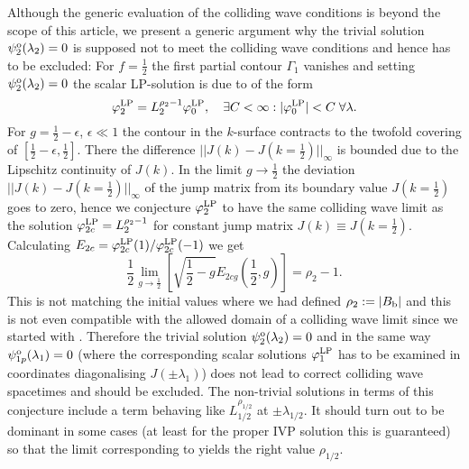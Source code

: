 \documentclass[12pt]{iopart}
\begin{document}
Although the generic evaluation of the colliding wave conditions is beyond the scope of this article, we present a generic argument why the trivial solution $\psi_2^{\rm o}(\lambda_2)=0$ is supposed not to meet the colliding wave conditions and hence has to be excluded:
 For $f=\frac12$ the first partial contour $\Gamma_1$ vanishes and setting $\psi_2^{\rm o}(\lambda_2)=0$ the scalar LP-solution is due to  of the form 
\begin{equation}
\varphi_2^{\rm LP}=L_2^{\rho_2-1}\varphi_0^{\rm LP}, \quad \exists C<\infty: |\varphi_0^{\rm LP}|<C \;\forall \lambda.
\end{equation}
For $g=\frac12-\epsilon$, $\epsilon\ll 1$ the contour in the $k$-surface contracts to the twofold covering of $[\frac12-\epsilon,\frac12]$. There the difference $||J(k)-J(k=\frac12)||_\infty$ is bounded due to the Lipschitz continuity of $J(k)$. In the limit $g\to \frac12$ the deviation $||J(k)-J(k=\frac12)||_\infty$ of the jump matrix from its boundary value $J(k=\frac12)$ goes to zero, hence we conjecture $\varphi_2^{\rm LP}$ to have the same colliding wave limit as the solution $\varphi_{2c}^{\rm LP}=L_2^{\rho_2-1}$ for constant jump matrix $J(k)\equiv J(k=\frac12)$. Calculating $E_{2c}=\varphi_{2c}^{\rm LP}(1)/\varphi_{2c}^{\rm LP}(-1)$ we get 
\begin{equation}
\frac12\lim_{g\to\frac12}\left[\sqrt{\mbox{$\frac12$}-g}E_{2cg}(\mbox{$\frac12$},g)\right]=\rho_2-1. \label{Elim}
\end{equation}
This is not matching the initial values where we had defined $\rho_2:=|B_{\rm b}|$ and this is not even compatible with the allowed domain  of a colliding wave limit since we started with . Therefore the trivial solution $\psi_2^{\rm o}(\lambda_2)=0$ and in the same way $\psi_{1p}^{\rm o}(\lambda_1)=0$ (where the corresponding scalar solutions $\varphi_1^{\rm LP}$ has to be examined in coordinates diagonalising $J(\pm\lambda_1)$) does not lead to correct colliding wave spacetimes and should be excluded. The non-trivial solutions in terms of this conjecture include a term behaving like $L_{1/2}^{\rho_{1/2}}$ at $\pm\lambda_{1/2}$. It should turn out to be dominant in some cases (at least for the proper IVP solution this is guaranteed) so that the limit corresponding to  yields the right value $\rho_{1/2}$.
\end{document}
